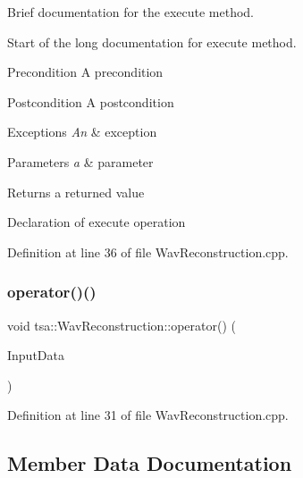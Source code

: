 Brief documentation for the execute method. 

Start of the long documentation for execute method.

\begin{DoxyPrecond}{Precondition}
A precondition 
\end{DoxyPrecond}
\begin{DoxyPostcond}{Postcondition}
A postcondition 
\end{DoxyPostcond}

\begin{DoxyExceptions}{Exceptions}
{\em An} & exception\\
\hline
\end{DoxyExceptions}

\begin{DoxyParams}{Parameters}
{\em a} & parameter\\
\hline
\end{DoxyParams}
\begin{DoxyReturn}{Returns}
a returned value
\end{DoxyReturn}
Declaration of execute operation 

Definition at line 36 of file Wav\+Reconstruction.\+cpp.

\mbox{\label{classtsa_1_1_wav_reconstruction_af5a0010f467f436732548165315efeb0}} 
\subsubsection{\texorpdfstring{operator()()}{operator()()}}
{\footnotesize\ttfamily void tsa\+::\+Wav\+Reconstruction\+::operator() (\begin{DoxyParamCaption}\item[{\hyperlink{namespacetsa_ac599574bcc094eda25613724b8f3ca9e}{Seq\+View\+Double} \&}]{Input\+Data }\end{DoxyParamCaption})}



Definition at line 31 of file Wav\+Reconstruction.\+cpp.



\subsection{Member Data Documentation}
\mbox{\label{classtsa_1_1_wav_reconstruction_a12d1f32ebdce8967bc9faacc7be2bad2}} 
